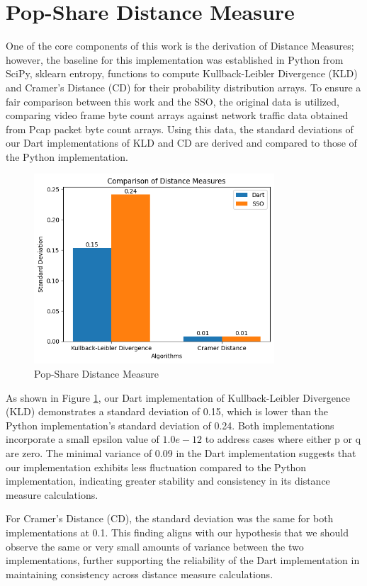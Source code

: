 \section{Pop-Share Distance Measure}
One of the core components of this work is the derivation of Distance Measures; however, the baseline for this implementation was established in Python from SciPy, sklearn entropy, functions to compute Kullback-Leibler Divergence (KLD) and Cramer’s Distance (CD) for their probability distribution arrays. To ensure a fair comparison between this work and the SSO, the original data is utilized, comparing video frame byte count arrays against network traffic data obtained from Pcap packet byte count arrays. Using this data, the standard deviations of our Dart implementations of KLD and CD are derived and compared to those of the Python implementation.

\begin{figure}[t]
    \centering
    \includegraphics[width=0.8\textwidth]{5 Results/Figures/5.2 Bar Chart.png}
    \caption{Pop-Share Distance Measure}
    \label{fig:pop-share-distance-measure}
\end{figure}

As shown in Figure \ref{fig:pop-share-distance-measure}, our Dart implementation of Kullback-Leibler Divergence (KLD) demonstrates a standard deviation of 0.15, which is lower than the Python implementation’s standard deviation of 0.24. Both implementations incorporate a small epsilon value of $1.0e-12$ to address cases where either p or q are zero. The minimal variance of 0.09 in the Dart implementation suggests that our implementation exhibits less fluctuation compared to the Python implementation, indicating greater stability and consistency in its distance measure calculations.

For Cramer's Distance (CD), the standard deviation was the same for both implementations at 0.1. This finding aligns with our hypothesis that we should observe the same or very small amounts of variance between the two implementations, further supporting the reliability of the Dart implementation in maintaining consistency across distance measure calculations.
